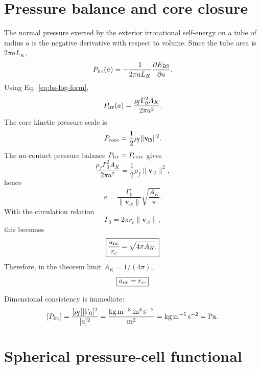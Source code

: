 \documentclass[11pt]{article}
\newcommand{\vnorm}{\lVert\mathbf{v}_{\!\boldsymbol{\circlearrowleft}}\rVert}
\newcommand{\rhof}{\rho_{\!f}}
\newcommand{\rc}{r_c}
\begin{document}
\section{Pressure balance and core closure}
\label{sec:pressure}

The normal pressure exerted by the exterior irrotational self-energy on a tube of radius \(a\)
is the negative derivative with respect to volume.  Since the tube area is \(2\pi aL_K\),
\begin{equation}
  P_{\rm irr}(a)
  =
  -\frac{1}{2\pi aL_K}\frac{\partial E_{\rm BS}}{\partial a}.
\end{equation}
Using Eq.~\eqref{eq:bs-log-form},
\begin{equation}
  P_{\rm irr}(a)
  =
  \frac{\rhof\Gamma_0^2A_K}{2\pi a^2}.
  \label{eq:Pirr}
\end{equation}
The core kinetic pressure scale is
\begin{equation}
  P_{\rm core}
  =
  \frac{1}{2}\rhof\vnorm^2.
  \label{eq:Pcore}
\end{equation}
The no-contact pressure balance \(P_{\rm irr}=P_{\rm core}\) gives
\begin{equation}
  \frac{\rhof\Gamma_0^2A_K}{2\pi a^2}
  =
  \frac{1}{2}\rhof\vnorm^2,
\end{equation}
hence
\begin{equation}
  a
  =
  \frac{\Gamma_0}{\vnorm}\sqrt{\frac{A_K}{\pi}}.
\end{equation}
With the circulation relation
\begin{equation}
  \Gamma_0=2\pi \rc\vnorm,
  \label{eq:gamma-relation}
\end{equation}
this becomes
\begin{equation}
  \boxed{\frac{a_{\rm nc}}{\rc}=\sqrt{4\pi A_K}.}
  \label{eq:anc}
\end{equation}
Therefore, in the theorem limit \(A_K=1/(4\pi)\),
\begin{equation}
  \boxed{a_{\rm nc}=\rc.}
\end{equation}

Dimensional consistency is immediate:
\[
  [P_{\rm irr}]
  =
  \frac{[\rhof][\Gamma_0]^2}{[a]^2}
  =
  \frac{\mathrm{kg\,m^{-3}}\;\mathrm{m^4\,s^{-2}}}{\mathrm{m^2}}
  =
  \mathrm{kg\,m^{-1}\,s^{-2}}
  =
  \mathrm{Pa}.
\]

\section{Spherical pressure-cell functional}
\label{sec:spherical}
\end{document}
